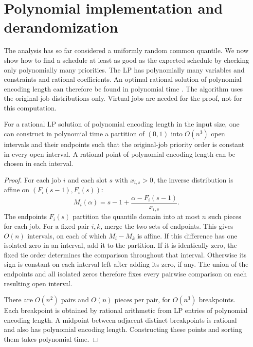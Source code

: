 \section{Polynomial implementation and derandomization}
\label{sec:foundations-derandomization}

The analysis has so far considered a uniformly random common quantile.
We now show how to find a schedule at least as good as the expected
schedule by checking only polynomially many priorities. The LP has
polynomially many variables and constraints and rational coefficients.
An optimal rational solution of polynomial encoding length can therefore
be found in polynomial time \cite{Schrijver1986}. The algorithm uses the original-job
distributions only. Virtual jobs are needed for the proof, not for this
computation.

\begin{lemma}
\label{lem:finite-priority-orders}
For a rational LP solution of polynomial encoding length in the input size,
one can construct in polynomial time a
partition of $(0,1)$ into $O(n^3)$ open intervals and their endpoints
such that the original-job priority order is constant in every open
interval. A rational point of polynomial encoding length can be chosen
in each interval.
\end{lemma}
\begin{proof}
For each job $i$ and each slot $s$ with $x_{i,s}>0$, the inverse
distribution is affine on $(F_i(s-1),F_i(s))$:
\[
 M_i(\alpha)=s-1+\frac{\alpha-F_i(s-1)}{x_{i,s}}.
\]
The endpoints $F_i(s)$ partition the quantile domain into at most
$n$ such pieces for each job. For a fixed pair $i,k$, merge the two
sets of endpoints. This gives $O(n)$ intervals, on each of which
$M_i-M_k$ is affine. If this difference has one isolated zero in an
interval, add it to the partition. If it is identically zero, the fixed
tie order determines the comparison throughout that interval. Otherwise
its sign is constant on each interval left after adding its zero, if any.
The union of the endpoints and all isolated zeros
therefore fixes every pairwise comparison on each resulting open
interval.

There are $O(n^2)$ pairs and $O(n)$ pieces per pair, for
$O(n^3)$ breakpoints. Each breakpoint is
obtained by rational arithmetic from LP entries of polynomial encoding
length. A midpoint between adjacent distinct breakpoints is rational and
also has polynomial encoding length. Constructing these points and
sorting them takes polynomial time.
\end{proof}

